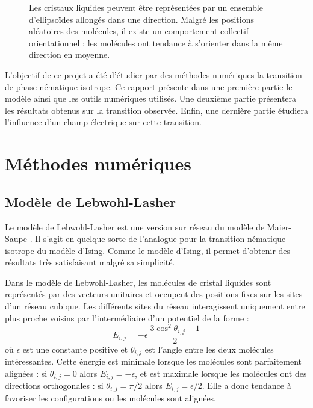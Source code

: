 \documentclass[11pt,a4paper]{article}
\numberwithin{equation}{section}
\begin{document}
\begin{figure}[h]
    \center
    
    \caption{Les cristaux liquides peuvent être représentées par un ensemble d'ellipsoïdes allongés dans une direction.
    Malgré les positions aléatoires des molécules, il existe un comportement collectif orientationnel : les molécules ont tendance à s'orienter dans la même direction en moyenne. }
    \label{nematic_phase}
\end{figure}

L'objectif de ce projet a été d'étudier par des méthodes numériques la transition de phase nématique-isotrope.
Ce rapport présente dans une première partie le modèle ainsi que les outils numériques utilisés. 
Une deuxième partie présentera les résultats obtenus sur la transition observée.
Enfin, une dernière partie étudiera l'influence d'un champ électrique sur cette transition.

\newpage
\section{Méthodes numériques}

\subsection{Modèle de Lebwohl-Lasher}
Le modèle de Lebwohl-Lasher \cite{model} est une version sur réseau du modèle de Maier-Saupe \cite{maier,maierbis}.
Il s'agit en quelque sorte de l'analogue pour la transition nématique-isotrope du modèle d'Ising. 
Comme le modèle d'Ising, il permet d'obtenir des résultats très satisfaisant malgré sa simplicité.
\medskip

Dans le modèle de Lebwohl-Lasher, les molécules de cristal liquides sont représentés par des vecteurs unitaires et occupent des positions fixes sur les sites d'un réseau cubique.
Les différents sites du réseau interagissent uniquement entre plus proche voisins par l'intermédiaire d'un potentiel de la forme :
\begin{equation}
E_{i,j} = - \epsilon\ \frac{3\cos^2\theta_{i,j}-1}{2}
\end{equation}
où $\epsilon$ est une constante positive et $\theta_{i,j}$ est l'angle entre les deux molécules intéressantes. 
Cette énergie est minimale lorsque les molécules sont parfaitement alignées : si $\theta_{i,j} = 0$ alors $E_{i,j} = - \epsilon$, et est maximale lorsque les molécules ont des directions orthogonales : si $\theta_{i,j} = \pi/2$ alors $E_{i,j} = \epsilon/2$.
Elle a donc tendance à favoriser les configurations ou les molécules sont alignées.
\medskip
\end{document}
